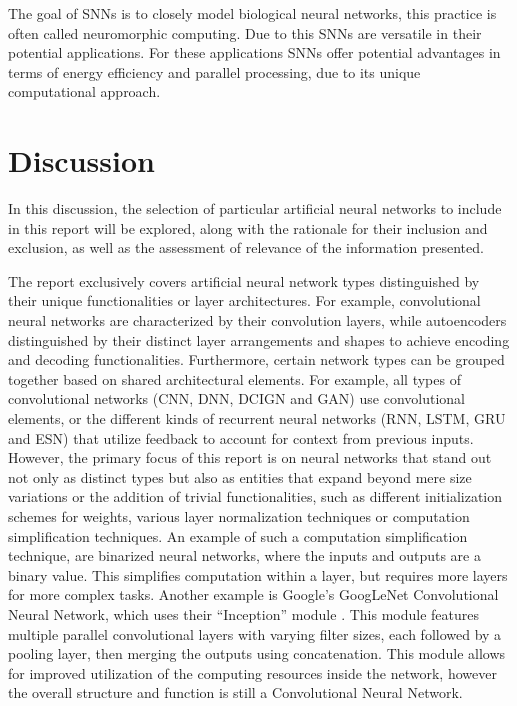 \documentclass[conference]{IEEEtran}
\begin{document}
The goal of SNNs is to closely model biological neural networks, this practice is often called neuromorphic computing. Due to this SNNs are versatile in their potential applications. For these applications SNNs offer potential advantages in terms of energy efficiency and parallel processing, due to its unique computational approach.

\section{Discussion} \label{Discussion} %
In this discussion, the selection of particular artificial neural networks to include in this report will be explored, along with the rationale for their inclusion and exclusion, as well as the assessment of relevance of the information presented.

The report exclusively covers artificial neural network types distinguished by their unique functionalities or layer architectures. For example, convolutional neural networks are characterized by their convolution layers, while autoencoders distinguished by their distinct layer arrangements and shapes to achieve encoding and decoding functionalities. Furthermore, certain network types can be grouped together based on shared architectural elements. For example, all types of convolutional networks (CNN, DNN, DCIGN and GAN) use convolutional elements, or the different kinds of recurrent neural networks (RNN, LSTM, GRU and ESN) that utilize feedback to account for context from previous inputs. However, the primary focus of this report is on neural networks that stand out not only as distinct types but also as entities that expand beyond mere size variations or the addition of trivial functionalities, such as different initialization schemes for weights, various layer normalization techniques or computation simplification techniques. An example of such a computation simplification technique, are binarized neural networks, where the inputs and outputs are a binary value. This simplifies computation within a layer, but requires more layers for more complex tasks. Another example is Google's GoogLeNet Convolutional Neural Network, which uses their ``Inception'' module \cite{szegedy2015going}. This module features multiple parallel convolutional layers with varying filter sizes, each followed by a pooling layer, then merging the outputs using concatenation. This module allows for improved utilization of the computing resources inside the network, however the overall structure and function is still a Convolutional Neural Network.
\end{document}
